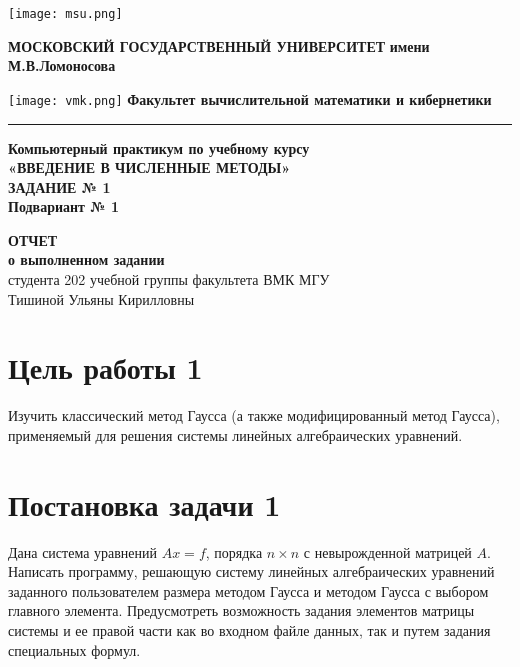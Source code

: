 \documentclass[a4paper,12pt,titlepage,finall]{article}
\begin{document}
\begin{titlepage}
	\begin{center}
	\texttt{[image: msu.png]}
	\hfill
	\begin{minipage}[b]{0.77\textwidth}
		\centering
		\textbf{\fontsize{12}{9}\selectfont МОСКОВСКИЙ ГОСУДАРСТВЕННЫЙ УНИВЕРСИТЕТ}
		\bigbreak
		\textbf{\fontsize{12}{9}\selectfont имени М.В.Ломоносова}
	\end{minipage}
	\hfill
	\texttt{[image: vmk.png]}
	\bigbreak
	\textbf{\fontsize{12}{9}\selectfont Факультет вычислительной математики и кибернетики}
	\end{center}
	\vspace{-0.1cm}
	\hrule
	
	\vfill
	
	\begin{center}
	{\fontsize{16}{30}\selectfont 
	\bf Компьютерный практикум по учебному курсу\\ 
				«ВВЕДЕНИЕ В ЧИСЛЕННЫЕ МЕТОДЫ» \\ 
				ЗАДАНИЕ № 1 \\
				Подвариант № 1\\}
				
	\vspace{20pt}
	
	{\fontsize{16}{30}\selectfont 
	\textbf{ОТЧЕТ\\
	о выполненном задании\\}
	студента 202 учебной группы факультета ВМК МГУ\\
	Тишиной Ульяны Кирилловны\\}
	\end{center}
	
	\vfill



\end{titlepage}

\tableofcontents
\newpage
\section{Цель работы 1}
Изучить классический метод Гаусса (а также модифицированный метод Гаусса), применяемый для решения системы линейных алгебраических уравнений.
\section{Постановка задачи 1}
Дана система уравнений $Ax=f$, порядка $n \times n$ с невырожденной матрицей $A$. Написать программу, решающую систему линейных алгебраических уравнений заданного пользователем размера методом Гаусса и методом Гаусса с выбором главного элемента. Предусмотреть возможность задания элементов матрицы системы и ее правой части как во входном файле данных, так и путем задания специальных формул.
\end{document}
